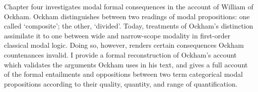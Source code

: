 \documentclass[]{article}
\begin{document}
Chapter four investigates modal formal consequences in the account of William of Ockham. Ockham distinguishes between two readings of modal propositions: one called `composite'; the other, `divided'. Today, treatments of Ockham's distinction assimilate it to one between wide and narrow-scope modality in first-order classical modal logic. Doing so, however, renders certain consequences Ockham countenances invalid. I provide a formal reconstruction of Ockham's account which validates the arguments Ockham uses in his text, and gives a full account of the formal entailments and oppositions between two term categorical modal propositions according to their quality, quantity, and range of quantification.

\end{document}

